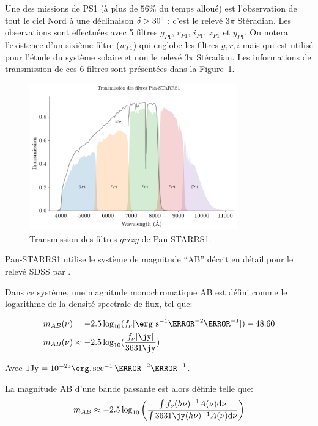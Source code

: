 \documentclass[../main/main.tex]{subfiles}
\begin{document}
Une des missions de PS1 (à plus de $56\%$ du temps alloué) est l'observation de tout le ciel Nord à une déclinaison $\delta>30\degree$ :
c'est le
relevé $3\pi$ Stéradian. Les observations sont effectuées avec 5 filtres
$g_{P1}$, $r_{P1}$, $i_{P1}$, $z_{P1}$ et $y_{P1}$. On notera
l'existence d'un  sixième
filtre ($w_{P1}$) qui
englobe les filtres $g,r,i$ mais qui est utilisé pour l'étude du système
solaire et non le relevé $3\pi$ Stéradian. Les informations
de transmission de ces $6$ filtres sont présentées dans la Figure~\ref{fig:ps1filters}.

\begin{figure}
  \centering
  \includegraphics[width=0.8\textwidth]{../figures/05_sedfit/ps1filters.png}
  \caption[Transmission des filtres Pan-STARRS1]{Transmission des
    filtres $grizy$ de Pan-STARRS1.}
  \label{fig:ps1filters}
\end{figure}


Pan-STARRS1 utilise le système de magnitude ``AB'' \citep{Oke1983}
décrit en détail pour le relevé SDSS \citep{YorkSDSS2000} par
\citet{Fukugita1996}.

Dans ce système, une magnitude monochromatique AB est défini comme le
logarithme de la densité spectrale de flux, tel que:

\begin{align}
  \label{eq:abmag}
  m_{AB}(\nu)&= -2.5\log_{10}(f_{\nu}[\erg\ \text{s}^{-1}\cm^{-2}\Hz^{-1}]) -
  48.60\\
  m_{AB}(\nu)&\approx -2.5\log_{10}(\frac{f_{\nu}[\jy]}{3631\jy})
\end{align}

Avec $1\text{Jy} = 10^{-23}\erg.\sec^{-1}\cm^{-2}\Hz^{-1}$.

La magnitude AB d'une bande passante est alors définie telle que:
\begin{equation}
  \label{eq:abmagbp}
  m_{AB}\approx-2.5\log_{10}\left(\frac{\int
      f_{\nu}(h\nu)^{-1}A(\nu)\d\nu}{\int 3631\jy(h\nu)^{-1}A(\nu)\d\nu}   \right)
\end{equation}
\end{document}
